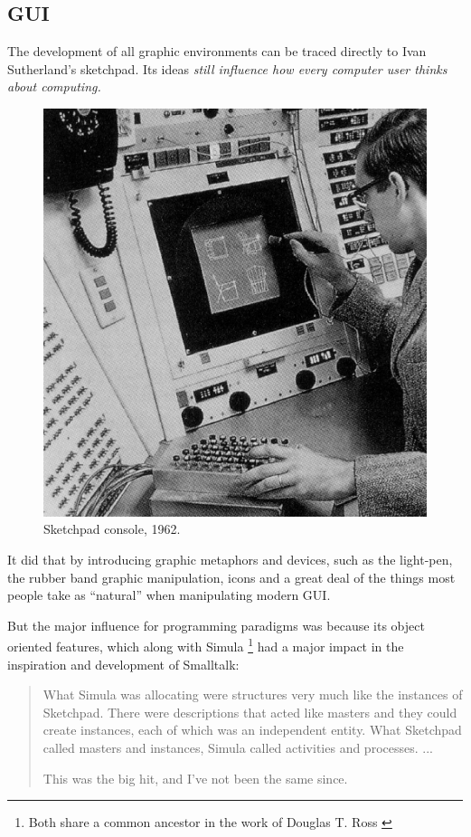 \subsection{GUI}

The development of all graphic environments can be traced directly to
Ivan Sutherland's sketchpad. Its ideas \emph{still influence how every
  computer user thinks about computing.}\cite{graphics:sutherland__sketchpad}

\begin{figure}
  \begin{center}
    \includegraphics[scale=0.15]{images/sketchpad.jpeg}
  \end{center}
  \caption{Sketchpad console, 1962. \cite{hypertext:muller__vision_and_reality}}
\end{figure}

It did that by introducing graphic metaphors and devices, such as the
light-pen, the rubber band graphic manipulation, icons and a great
deal of the things most people take as ``natural'' when manipulating
modern GUI. \cite{graphics:sutherland__sketchpad}

But the major influence for programming paradigms was because its
object oriented features, which along with Simula \footnote{Both share
  a common ancestor in the work of Douglas T. Ross
  \cite{graphics:sutherland__sketchpad}} had a major impact in the
inspiration and development of Smalltalk: 

\begin{quote}
  What Simula was allocating were structures very much like the
  instances of Sketchpad. There were descriptions that acted like
  masters and they could create instances, each of which was an
  independent entity. What Sketchpad called masters and instances,
  Simula called activities and processes. ...

  This was the big hit, and I've not been the same since.
  \cite{smalltalk:kay_alan__early_history_smalltalk}
\end{quote} 
